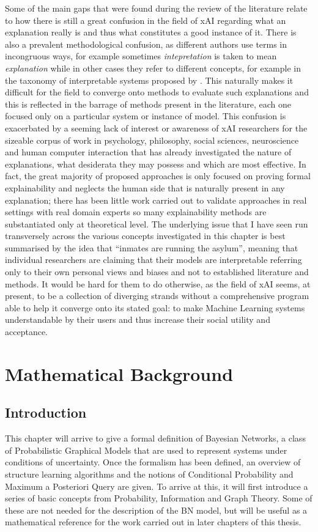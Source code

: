 \documentclass[mscthesis]{usiinfthesis}
\begin{document}
Some of the main gaps that were found during the review of the literature relate to how there is still a great confusion in the field of xAI regarding what an explanation really is and thus what constitutes a good instance of it.
There is also a prevalent methodological confusion, as different authors use terms in incongruous ways, for example sometimes \textit{intepretation} is taken to mean \textit{explanation} while in other cases they refer to different concepts, for example in the taxonomy of interpretable systems proposed by \cite{doshi2017towards}.
This naturally makes it difficult for the field to converge onto methods to evaluate such explanations and this is reflected in the barrage of methods present in the literature, each one focused only on a particular system or instance of model.
This confusion is exacerbated by a seeming lack of interest or awareness of xAI researchers for the sizeable corpus of work in psychology, philosophy, social sciences, neuroscience and human computer interaction that has already investigated the nature of explanations, what desiderata they may possess and which are most effective.
In fact, the great majority of proposed approaches is only focused on proving formal explainability and neglects the human side that is naturally present in any explanation; there has been little work carried out to validate approaches in real settings with real domain experts so many explainability methods are substantiated only at theoretical level.
The underlying issue that I have seen run transversely across the various concepts investigated in this chapter is best summarised by the idea that \enquote{inmates are running the asylum}, meaning that individual researchers are claiming that their models are interpretable referring only to their own personal views and biases and not to established literature and methods.
It would be hard for them to do otherwise, as the field of xAI seems, at present, to be a collection of diverging strands without a comprehensive program able to help it converge onto its stated goal: to make Machine Learning systems understandable by their users and thus increase their social utility and acceptance.

\chapter{Mathematical Background}\label{chap:mathematical-background}
\section{Introduction}
This chapter will arrive to give a formal definition of Bayesian Networks, a class of Probabilistic Graphical Models that are used to represent systems under conditions of uncertainty.
Once the formalism has been defined, an overview of structure learning algorithms and the notions of Conditional Probability and Maximum a Posteriori Query are given.
To arrive at this, it will first introduce a series of basic concepts from Probability, Information and Graph Theory.
Some of these are not needed for the description of the BN model, but will be useful as a mathematical reference for the work carried out in later chapters of this thesis.
\end{document}
